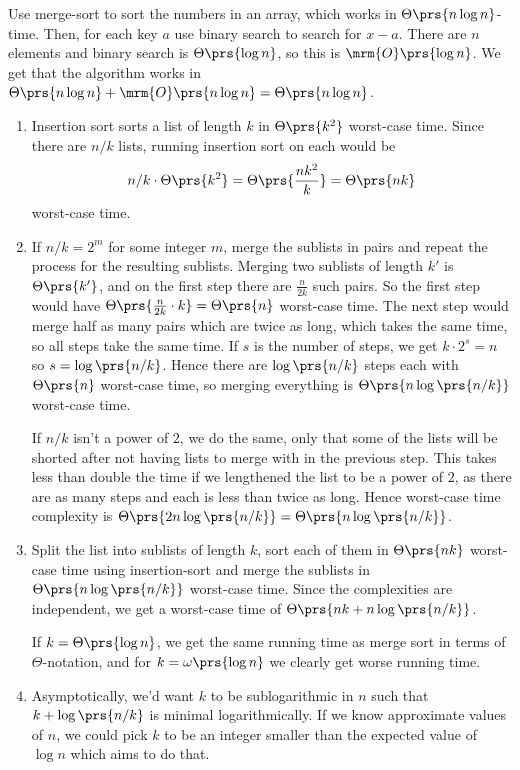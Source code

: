 \documentclass[oneside]{scrbook}
\theoremstyle{definition}
\begin{document}
\begin{exercise}
    Use merge-sort to sort the numbers in an array, which works in $\Theta\prs{n \log n}$-time. Then, for each key $a$ use binary search to search for $x-a$. There are $n$ elements and binary search is $\Theta\prs{\log n}$, so this is $\mrm{O}\prs{\log n}$. We get that the algorithm works in $\Theta\prs{n \log n} + \mrm{O}\prs{n \log n} = \Theta\prs{n \log n}$.
\end{exercise}

\begin{problem}
    \begin{enumerate}[label = \alph*.]
    \item
    Insertion sort sorts a list of length $k$ in $\Theta\prs{k^2}$ worst-case time. Since there are $n/k$ lists, running insertion sort on each would be \[n/k \cdot \Theta\prs{k^2} = \Theta\prs{\frac{nk^2}{k}} = \Theta\prs{nk}\] worst-case time.
    
    \item
    If $n/k = 2^m$ for some integer $m$, merge the sublists in pairs and repeat the process for the resulting sublists. Merging two sublists of length $k'$ is $\Theta\prs{k'}$, and on the first step there are $\frac{n}{2k}$ such pairs. So the first step would have $\Theta\prs{\frac{n}{2k} \cdot k} = \Theta\prs{n}$ worst-case time. The next step would merge half as many pairs which are twice as long, which takes the same time, so all steps take the same time. If $s$ is the number of steps, we get $k \cdot 2^s = n$ so $s = \log\prs{n/k}$. Hence there are $\log\prs{n/k}$ steps each with $\Theta\prs{n}$ worst-case time, so merging everything is $\Theta\prs{n \log\prs{n/k}}$ worst-case time.
    
    If $n/k$ isn't a power of $2$, we do the same, only that some of the lists will be shorted after not having lists to merge with in the previous step. This takes less than double the time if we lengthened the list to be a power of $2$, as there are as many steps and each is less than twice as long. Hence worst-case time complexity is $\Theta\prs{2 n \log\prs{n/k}} = \Theta\prs{n \log\prs{n/k}}$. 
    
    \item
    Split the list into sublists of length $k$, sort each of them in $\Theta\prs{nk}$ worst-case time using insertion-sort and merge the sublists in $\Theta\prs{n \log \prs{n/k}}$ worst-case time. Since the complexities are independent, we get a worst-case time of $\Theta\prs{nk + n \log\prs{n/k}}$.
    
    If $k = \Theta\prs{\log n}$, we get the same running time as merge sort in terms of $\Theta$-notation, and for $k = \omega\prs{\log n}$ we clearly get worse running time.
    
    \item
    Asymptotically, we'd want $k$ to be sublogarithmic in $n$ such that $k + \log\prs{n/k}$ is minimal logarithmically. If we know approximate values of $n$, we could pick $k$ to be an integer smaller than the expected value of $\log n$ which aims to do that. 
    \end{enumerate}
\end{problem}
\end{document}
